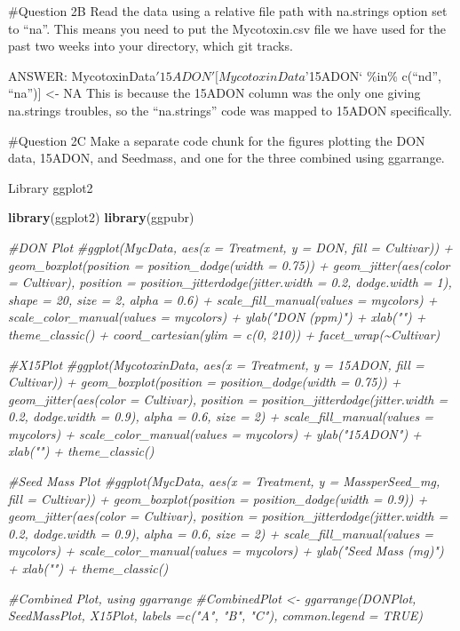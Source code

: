 \documentclass[
]{article}
\newenvironment{Shaded}{\begin{snugshade}}{\end{snugshade}}
\newcommand{\CommentTok}[1]{\textcolor[rgb]{0.56,0.35,0.01}{\textit{#1}}}
\newcommand{\FunctionTok}[1]{\textcolor[rgb]{0.13,0.29,0.53}{\textbf{#1}}}
\newcommand{\NormalTok}[1]{#1}
\begin{document}
\#Question 2B Read the data using a relative file path with na.strings
option set to ``na''. This means you need to put the Mycotoxin.csv file
we have used for the past two weeks into your directory, which git
tracks.

ANSWER: MycotoxinData\('15ADON'[MycotoxinData\)'15ADON` \%in\% c(``nd'',
``na''){]} \textless- NA This is because the 15ADON column was the only
one giving na.strings troubles, so the ``na.strings'' code was mapped to
15ADON specifically.

\#Question 2C Make a separate code chunk for the figures plotting the
DON data, 15ADON, and Seedmass, and one for the three combined using
ggarrange.

Library ggplot2

\begin{Shaded}
\begin{Highlighting}[]
\FunctionTok{library}\NormalTok{(ggplot2)}
\FunctionTok{library}\NormalTok{(ggpubr)}
\end{Highlighting}
\end{Shaded}

\begin{Shaded}
\begin{Highlighting}[]
\CommentTok{\#DON Plot}
\CommentTok{\#ggplot(MycData, aes(x = Treatment, y = DON, fill = Cultivar)) + geom\_boxplot(position = position\_dodge(width = 0.75)) + geom\_jitter(aes(color = Cultivar), position = position\_jitterdodge(jitter.width = 0.2, dodge.width = 1), shape = 20, size = 2, alpha = 0.6) + scale\_fill\_manual(values = mycolors) + scale\_color\_manual(values = mycolors) + ylab("DON (ppm)") + xlab("") + theme\_classic() + coord\_cartesian(ylim = c(0, 210)) + facet\_wrap(\textasciitilde{}Cultivar)}

\CommentTok{\#X15Plot}
\CommentTok{\#ggplot(MycotoxinData, aes(x = Treatment, y = \textquotesingle{}15ADON\textquotesingle{}, fill = Cultivar)) + geom\_boxplot(position = position\_dodge(width = 0.75)) + geom\_jitter(aes(color = Cultivar), position = position\_jitterdodge(jitter.width = 0.2, dodge.width = 0.9), alpha = 0.6, size = 2) + scale\_fill\_manual(values = mycolors) + scale\_color\_manual(values = mycolors) + ylab("15ADON") + xlab("") + theme\_classic()}

\CommentTok{\#Seed Mass Plot}
\CommentTok{\#ggplot(MycData, aes(x = Treatment, y = MassperSeed\_mg, fill = Cultivar)) + geom\_boxplot(position = position\_dodge(width = 0.9)) + geom\_jitter(aes(color = Cultivar), position = position\_jitterdodge(jitter.width = 0.2, dodge.width = 0.9), alpha = 0.6, size = 2) + scale\_fill\_manual(values = mycolors) + scale\_color\_manual(values = mycolors) + ylab("Seed Mass (mg)") + xlab("") + theme\_classic() }

\CommentTok{\#Combined Plot, using ggarrange}
\CommentTok{\#CombinedPlot \textless{}{-} ggarrange(DONPlot, SeedMassPlot, X15Plot, labels =c("A", "B", "C"), common.legend = TRUE) }
\end{Highlighting}
\end{Shaded}
\end{document}

